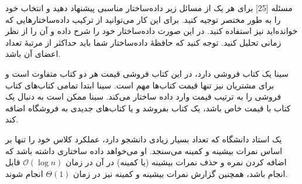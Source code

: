 ‌مسئله [25]
برای هر یک از مسائل زیر داده‌ساختار مناسبی پیشنهاد دهید و انتخاب خود را به طور مختصر توجیه کنید. برای این کار می‌توانید از ترکیب داده‌ساختار‌هایی که خوانده‌اید نیز استفاده کنید. در این صورت داده‌ساختار خود را شرح داده و آن را از نظر زمانی تحلیل کنید. توجه کنید که حافظهٔ داده‌ساختار شما باید حداکثر از مرتبهٔ تعداد اعضای آن باشد.

سینا یک کتاب فروشی دارد، در این کتاب فروشی قیمت هر دو کتاب متفاوت است و برای مشتریان نیز تنها قیمت کتاب‌ها مهم است. سینا ابتدا تمامی کتاب‌های کتاب فروشی را به ترتیب قیمت وارد داده ساختار می‌کند. سینا ممکن است به دنبال یک کتاب با قیمت خاص باشد، یک کتاب بفروشد و یا کتاب‌های جدیدی به فروشگاه اضافه کند.


یک استاد دانشگاه که تعداد بسیار زیادی دانشجو دارد، عملکرد کلاس خود را تنها بر اساس نمرات بیشینه و کمینه می‌سنجد. او می‌خواهد داده ساختاری داشته باشد که اضافه کردن نمره و حذف نمرات بیشینه (یا کمینه) در آن در زمان 
$\mathcal{O}(\log n)$
قابل انجام باشد، همچنین گزارش نمرات بیشینه و کمینه نیز در زمان 
$\Theta(1)$
انجام شوند.

